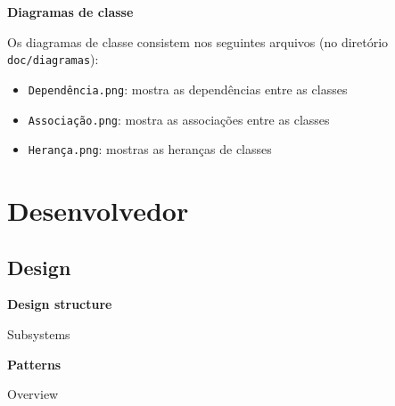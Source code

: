 \documentclass[12pt,letterpaper]{article}
\begin{document}
\pagebreak

\vspace{1cm}
{\large {\bf Diagramas de classe}}
\vspace{0.5cm}

Os diagramas de classe consistem nos seguintes arquivos (no diretório \texttt{doc/diagramas}):

\begin{itemize}
\item{}\texttt{Dependência.png}: mostra as dependências entre as classes
\item{}\texttt{Associação.png}: mostra as associações entre as classes
\item{}\texttt{Herança.png}: mostras as heranças de classes
\end{itemize}


\pagebreak

\section{Desenvolvedor}

\subsection{Design}

\vspace{1cm}
{\large {\bf Design structure}}
\vspace{0.5cm}




Subsystems






\vspace{1cm}
{\large {\bf Patterns}}
\vspace{0.5cm}



Overview
\end{document}
